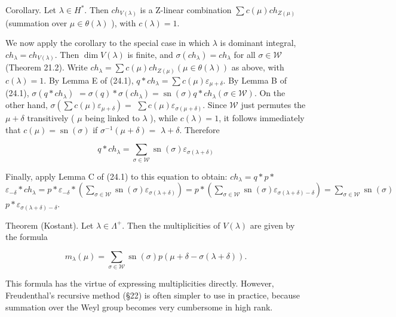 \documentclass[10pt]{article}
\begin{document}
Corollary. Let $\lambda \in H^{*}$. Then $c h_{V(\lambda)}$ is a Z-linear combination $\sum c(\mu) c h_{Z(\mu)}$ (summation over $\mu \in \theta(\lambda)$ ), with $c(\lambda)=1$.

We now apply the corollary to the special case in which $\lambda$ is dominant integral, $c h_{\lambda}=c h_{V(\lambda)}$. Then $\operatorname{dim} V(\lambda)$ is finite, and $\sigma\left(c h_{\lambda}\right)=c h_{\lambda}$ for all $\sigma \in \mathscr{W}$ (Theorem 21.2). Write $c h_{\lambda}=\sum c(\mu) c h_{Z(\mu)}(\mu \in \theta(\lambda))$ as above, with $c(\lambda)=1$. By Lemma E of (24.1), $q * c h_{\lambda}=\sum c(\mu) \varepsilon_{\mu+\delta}$. By Lemma B of (24.1), $\sigma\left(q * c h_{\lambda}\right)$ $=\sigma(q) * \sigma\left(c h_{\lambda}\right)=\operatorname{sn}(\sigma) q * c h_{\lambda}(\sigma \in \mathscr{W})$. On the other hand, $\sigma\left(\sum c(\mu) \varepsilon_{\mu+\delta}\right)=$ $\sum c(\mu) \varepsilon_{\sigma(\mu+\delta)}$. Since $\mathscr{W}$ just permutes the $\mu+\delta$ transitively ( $\mu$ being linked to $\lambda$ ), while $c(\lambda)=1$, it follows immediately that $c(\mu)=\operatorname{sn}(\sigma)$ if $\sigma^{-1}(\mu+\delta)=$ $\lambda+\delta$. Therefore


\begin{equation*}
q * c h_{\lambda}=\sum_{\sigma \in \mathscr{W}} \operatorname{sn}(\sigma) \varepsilon_{\sigma(\lambda+\delta)} \tag{*}
\end{equation*}


Finally, apply Lemma C of (24.1) to this equation to obtain: $c h_{\lambda}=q * p *$ $\varepsilon_{-\delta} * c h_{\lambda}=p * \varepsilon_{-\delta} *\left(\sum_{\sigma \in \mathscr{W}} \operatorname{sn}(\sigma) \varepsilon_{\sigma(\lambda+\delta)}\right)=p *\left(\sum_{\sigma \in \mathscr{W}} \operatorname{sn}(\sigma) \varepsilon_{\sigma(\lambda+\delta)-\delta}\right)=\sum_{\sigma \in \mathscr{W}} \operatorname{sn}(\sigma)$ $p * \varepsilon_{\sigma(\lambda+\delta)-\delta}$.

Theorem (Kostant). Let $\lambda \in \Lambda^{+}$. Then the multiplicities of $V(\lambda)$ are given by the formula

$$
m_{\lambda}(\mu)=\sum_{\sigma \in \mathscr{W}} \operatorname{sn}(\sigma) p(\mu+\delta-\sigma(\lambda+\delta)) .
$$

This formula has the virtue of expressing multiplicities directly. However, Freudenthal's recursive method (§22) is often simpler to use in practice, because summation over the Weyl group becomes very cumbersome in high rank.
\end{document}

